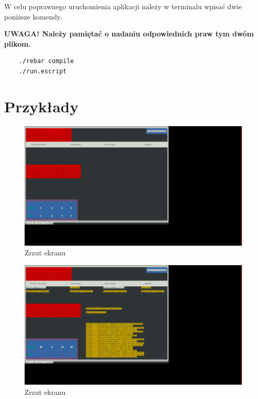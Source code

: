 \documentclass[a4paper,12pt]{article}
\begin{document}
	W celu poprawnego uruchomienia aplikacji należy w terminalu wpisać dwie poniższe komendy.
	
	\textbf{UWAGA! Należy pamiętać o nadaniu odpowiednich praw tym dwóm plikom.}
	
	\begin{lstlisting}
	./rebar compile
	./run.escript
	\end{lstlisting}
	
	
	\section{Przykłady}
	
	\begin{figure}[!htb]
		\centering
		\includegraphics[width=1.1\linewidth]{terminal1}
		\caption{\label{fig:screen} Zrzut ekranu}
	\end{figure}

	\begin{figure}[!htb]
	\centering
	\includegraphics[width=1.1\linewidth]{terminal2}
	\caption{\label{fig:screen2} Zrzut ekranu}
\end{figure}
	
\end{document}
